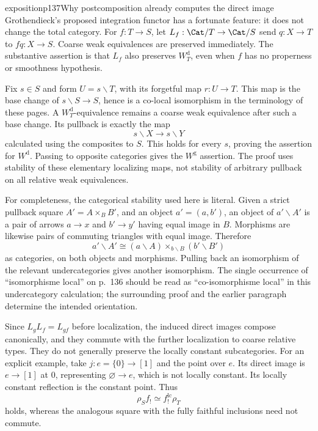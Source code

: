 \begin{dcomment}{exposition}{p137}{Why postcomposition already computes the direct image}
Grothendieck's proposed integration functor has a fortunate feature: it does not change the total category. For $f:T\to S$, let $L_f:\Cat/T\to\Cat/S$ send $q:X\to T$ to $fq:X\to S$. Coarse weak equivalences are preserved immediately. The substantive assertion is that $L_f$ also preserves $W_T^{\mathrm d}$, even when $f$ has no properness or smoothness hypothesis.

Fix $s\in S$ and form $U=s\backslash T$, with its forgetful map $r:U\to T$. This map is the base change of $s\backslash S\to S$, hence is a co-local isomorphism in the terminology of these pages. A $W_T^{\mathrm d}$-equivalence remains a coarse weak equivalence after such a base change. Its pullback is exactly the map
\[
 s\backslash X\longrightarrow s\backslash Y
\]
calculated using the composites to $S$. This holds for every $s$, proving the assertion for $W^{\mathrm d}$. Passing to opposite categories gives the $W^{\mathrm g}$ assertion. The proof uses stability of these elementary localizing maps, not stability of arbitrary pullback on all relative weak equivalences.

For completeness, the categorical stability used here is literal. Given a strict pullback square $A'=A\times_BB'$, and an object $a'=(a,b')$, an object of $a'\backslash A'$ is a pair of arrows $a\to x$ and $b'\to y'$ having equal image in $B$. Morphisms are likewise pairs of commuting triangles with equal image. Therefore
\[
 a'\backslash A'\cong
 (a\backslash A)\times_{b\backslash B}(b'\backslash B')
\]
as categories, on both objects and morphisms. Pulling back an isomorphism of the relevant undercategories gives another isomorphism. The single occurrence of ``isomorphisme local'' on p.~136 should be read as ``co-isomorphisme local'' in this undercategory calculation; the surrounding proof and the earlier paragraph determine the intended orientation.

Since $L_gL_f=L_{gf}$ before localization, the induced direct images compose canonically, and they commute with the further localization to coarse relative types. They do not generally preserve the locally constant subcategories. For an explicit example, take $j:e=\{0\}\to[1]$ and the point over $e$. Its direct image is $e\to[1]$ at $0$, representing $\varnothing\to e$, which is not locally constant. Its locally constant reflection is the constant point. Thus
\[
 \rho_S f_!\simeq f_!^{\mathrm{lc}}\rho_T
\]
holds, whereas the analogous square with the fully faithful inclusions need not commute.


\end{dcomment}
